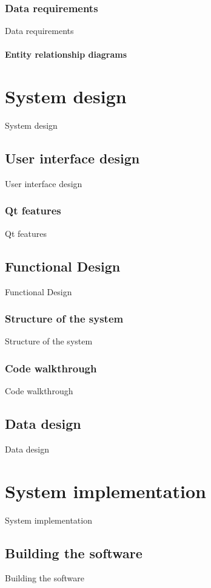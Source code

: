 \documentclass[12pt]{report}
\begin{document}
\section{Data requirements}
Data requirements

\subsection{Entity relationship diagrams}

\part{System design}
System design

\chapter{User interface design}
User interface design

\section{Qt features}
Qt features

\chapter{Functional Design}
Functional Design

\section{Structure of the system}
Structure of the system

\section{Code walkthrough}
Code walkthrough


\chapter{Data design}
Data design

\part{System implementation}
System implementation

\chapter{Building the software}
Building the software
\end{document}
